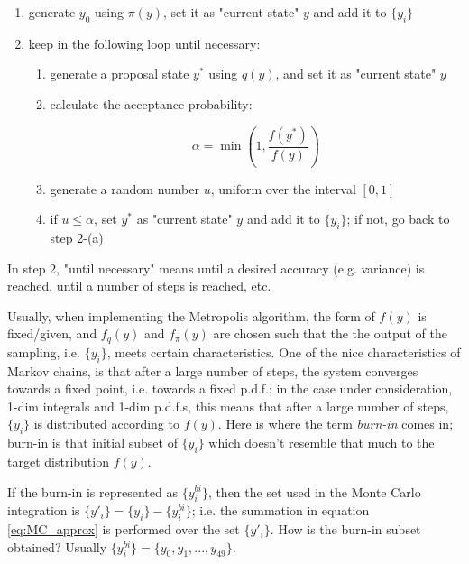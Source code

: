 \documentclass[paper=a4, fontsize=11pt]{scrartcl} %
\numberwithin{equation}{section} %
\numberwithin{figure}{section} %
\numberwithin{table}{section} %
\begin{document}
\begin{enumerate}

\item generate $y_{0}$ using $\pi(y)$, set it as "current state" $y$ and add it to $\{ y_{i} \}$
\item keep in the following loop until necessary:

\begin{enumerate}

\item generate a proposal state $y^{*}$ using $q(y)$, and set it as "current state" $y$
\item calculate the acceptance probability:

\begin{equation}
\label{eq:MC_approx}
\alpha = \min\left( 1, \frac{f(y^{*})}{f(y)} \right)
\end{equation}

\item generate a random number $u$, uniform over the interval $[0,1]$
\item if $u \le \alpha$, set $y^{*}$ as "current state" $y$ and add it to $\{ y_{i} \}$; if not, go back to step 2-(a)

\end{enumerate}

\end{enumerate}

In step 2, "until necessary" means until a desired accuracy (e.g. variance) is reached, until a number of steps is reached, etc.

Usually, when implementing the Metropolis algorithm, the form of $f(y)$ is fixed/given, and $f_{q}(y)$ and $f_{\pi}(y)$ are chosen such that the the output of the sampling, i.e. $\{ y_{i} \}$, meets certain characteristics. One of the nice characteristics of Markov chains, is that after a large number of steps, the system converges towards a fixed point, i.e. towards a fixed p.d.f.; in the case under consideration, 1-dim integrals and 1-dim p.d.f.s, this means that after a large number of steps, $\{ y_{i} \}$ is distributed according to $f(y)$. Here is where the term \textit{burn-in} comes in; burn-in is that initial subset of $\{ y_{i} \}$ which doesn't resemble that much to the target distribution $f(y)$.

If the burn-in is represented as $\{ y_{i}^{bi} \}$, then the set used in the Monte Carlo integration is $\{ y'_{i} \} = \{ y_{i} \} - \{ y^{bi}_{i} \} $; i.e. the summation in equation \ref{eq:MC_approx} is performed over the set $\{ y'_{i} \}$. How is the burn-in subset obtained? Usually $\{ y^{bi}_{i} \} = \{ y_{0}, y_{1}, ..., y_{49} \}$.
\end{document}

